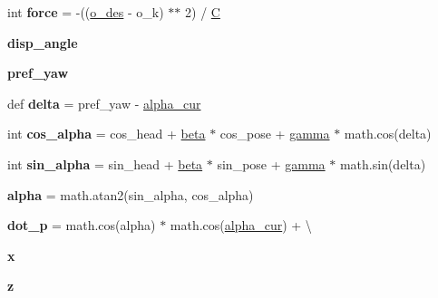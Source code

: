 \begin{DoxyCompactItemize}
\mbox{\label{namespaceagent__driver_a02f3b2ebda7bf3059d807a0635ea0e58}} 
int {\bfseries force} = -\/((\hyperlink{namespaceagent__driver_afa84d8b37bda7e27d006422ae25c7ade}{o\+\_\+des} -\/ o\+\_\+k) $\ast$$\ast$ 2) / \hyperlink{namespaceagent__driver_ae1469a5763093bc8ac47f837fd58bc9c}{C}
\item 
{\bfseries disp\+\_\+angle}
\item 
{\bfseries pref\+\_\+yaw}
\item 
\mbox{\label{namespaceagent__driver_a06cf349e2da97db20ebd4bc072f408e7}} 
def {\bfseries delta} = pref\+\_\+yaw -\/ \hyperlink{namespaceagent__driver_a7cc62c7cce7f7b052d6c6dee070dd165}{alpha\+\_\+cur}
\item 
\mbox{\label{namespaceagent__driver_a2f759ce73f69deb2bbadcd6e11142a58}} 
int {\bfseries cos\+\_\+alpha} = cos\+\_\+head + \hyperlink{namespaceagent__driver_a19ad1680988a89c19242137b0124df38}{beta} $\ast$ cos\+\_\+pose + \hyperlink{namespaceagent__driver_af804ab7d71c017a84796b859dc03f9b6}{gamma} $\ast$ math.\+cos(delta)
\item 
\mbox{\label{namespaceagent__driver_a97b58b33728b27b8faa265ba4e1ff78a}} 
int {\bfseries sin\+\_\+alpha} = sin\+\_\+head + \hyperlink{namespaceagent__driver_a19ad1680988a89c19242137b0124df38}{beta} $\ast$ sin\+\_\+pose + \hyperlink{namespaceagent__driver_af804ab7d71c017a84796b859dc03f9b6}{gamma} $\ast$ math.\+sin(delta)
\item 
\mbox{\label{namespaceagent__driver_a7db4de5a187ae04af096fcc96fc5ce1c}} 
{\bfseries alpha} = math.\+atan2(sin\+\_\+alpha, cos\+\_\+alpha)
\item 
\mbox{\label{namespaceagent__driver_a6b2b8d26a341bf85b52ad8063caf0ded}} 
{\bfseries dot\+\_\+p} = math.\+cos(alpha) $\ast$ math.\+cos(\hyperlink{namespaceagent__driver_a7cc62c7cce7f7b052d6c6dee070dd165}{alpha\+\_\+cur}) + \textbackslash{}
\item 
\mbox{\label{namespaceagent__driver_ad528f849546965c29767e80dd20b4443}} 
{\bfseries x}
\item 
\mbox{\label{namespaceagent__driver_a7e6afdb8ba53accace582aed31678869}} 
{\bfseries z}
\end{DoxyCompactItemize}


